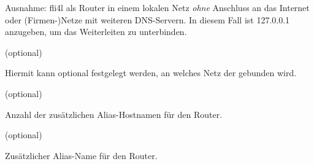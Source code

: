 \begin{description}
{      Ausnahme: fli4l als Router in einem lokalen Netz \emph{ohne}
      Anschluss an das Internet oder (Firmen-)Netze mit weiteren
      DNS-Servern. In diesem Fall ist 127.0.0.1 anzugeben, um das
      Weiterleiten zu unterbinden.}

     (optional)

    {Hiermit kann optional festgelegt werden, an welches Netz 
    der  gebunden wird.}

     (optional)

    {Anzahl der zusätzlichen Alias-Hostnamen für den Router.}

     (optional)

    {Zusätzlicher Alias-Name für den Router.}

  \end{description}

